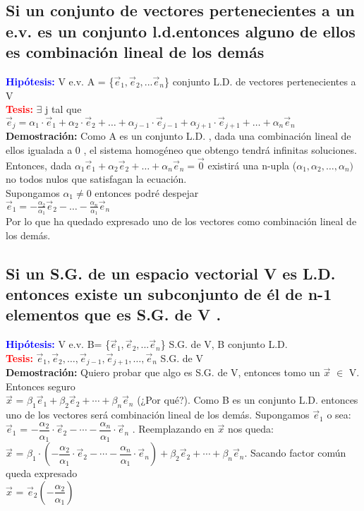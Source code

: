\documentclass{article}
\begin{document}
\subsection{Si un conjunto de vectores pertenecientes a un e.v. es un conjunto l.d.entonces alguno de ellos es combinación lineal de los demás }
{\bfseries \textcolor{blue}{Hipótesis:}} V e.v. A = \{$\vec{e}_{1}, \vec{e}_2,... \vec{e}_n $\} conjunto L.D. de vectores pertenecientes a V \\
{\bfseries \textcolor{red}{Tesis:}} $\exists$ j tal que $\vec{e}_j = \alpha_1\cdot\vec{e}_1 + \alpha_2\cdot\vec{e}_2 + \hdots + \alpha_{j-1}\cdot\vec{e}_{j-1} + \alpha_{j+1}\cdot\vec{e}_{j+1} + \hdots + \alpha_n\vec{e}_n$\\
{\bfseries Demostración:} Como A es un conjunto L.D. , dada una combinación lineal de ellos igualada a 0  , el sistema homogéneo que obtengo tendrá infinitas soluciones. \\
Entonces, dada $\alpha_1\vec{e}_1+\alpha_2\vec{e}_2+\hdots+\alpha_n\vec{e}_{n} = \vec{0}$ existirá una n-upla ($\alpha_1,\alpha_2,\hdots,\alpha_n)$ no todos nulos que satisfagan la ecuación.\\
Supongamos $\alpha_1 \neq 0$ entonces podré despejar \\
$\vec{e}_1 = -\frac{\alpha_2}{\alpha_1} \vec{e}_2 - \hdots - \frac{\alpha_n}{\alpha_1}\vec{e}_n$\\
Por lo que ha quedado expresado uno de los vectores como combinación lineal de los demás. 
\newpage
\subsection{Si un S.G. de un espacio vectorial V es L.D. entonces existe un subconjunto de él de n-1 elementos que es S.G. de V .}
{\bfseries \textcolor{blue}{Hipótesis:}} V e.v. B= \{$\vec{e}_{1}, \vec{e}_2,... \vec{e}_n $\} S.G. de V, B conjunto L.D. \\
{\bfseries \textcolor{red}{Tesis:}} $\vec{e}_1 , \vec{e}_2 , \hdots , \vec{e}_{j-1} , \vec{e}_{j+1} , \hdots , \vec{e}_n$ S.G. de V\\
{\bfseries Demostración:} Quiero probar que algo es S.G. de V, entonces tomo un $\vec{x}$ $\in$ V. Entonces seguro\\ $\vec{x}$ = $\beta_1\vec{e}_1+\beta_2\vec{e}_2+\cdots+\beta_n\vec{e}_n$ (¿Por qué?). Como B es un conjunto L.D. entonces uno de los vectores será combinación lineal de los demás. Supongamos $\vec{e}_1$ o sea: \\
$\vec{e}_1$ = $-\dfrac{\alpha_2}{\alpha_1}\cdot\vec{e}_2 - \cdots - \dfrac{\alpha_n}{\alpha_1}\cdot\vec{e}_n$ . Reemplazando en $\vec{x}$ nos queda: \\
$\vec{x}$ = $\beta_1 \cdot (-\dfrac{\alpha_2}{\alpha_1}\cdot\vec{e}_2 - \cdots - \dfrac{\alpha_n}{\alpha_1}\cdot\vec{e}_n)+\beta_2\vec{e}_2+\cdots+\beta_n\vec{e}_n $. Sacando factor común queda expresado\\ $\vec{x}$ = $\vec{e}_2(- \dfrac{\alpha_2}{\alpha_1})$  
\end{document}
